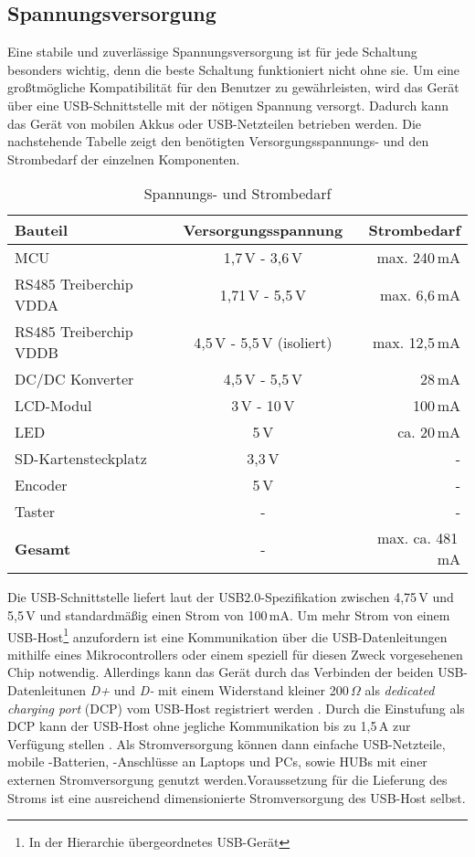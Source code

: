 
\subsection{Spannungsversorgung}
Eine stabile und zuverlässige Spannungsversorgung ist für jede Schaltung besonders wichtig, denn die beste Schaltung funktioniert nicht ohne sie. Um eine großtmögliche Kompatibilität für den Benutzer zu gewährleisten, wird das Gerät über eine USB-Schnittstelle mit der nötigen Spannung versorgt. Dadurch kann das Gerät von mobilen Akkus oder USB-Netzteilen betrieben werden. Die nachstehende Tabelle zeigt den benötigten Versorgungsspannungs- und den Strombedarf der einzelnen Komponenten. 
\begin{table}[h]
	\begin{center}
		\begin{tabular}{l | c | r }
			\textbf{Bauteil} & \textbf{Versorgungsspannung} & \textbf{Strombedarf}\\
			\hline
			MCU & 1,7\,V - 3,6\,V & max. 240\,mA\\
			RS485 Treiberchip VDDA & 1,71\,V - 5,5\,V & max. 6,6\,mA\\
			RS485 Treiberchip VDDB & 4,5\,V - 5,5\,V (isoliert)& max. 12,5\,mA\\
			DC/DC Konverter & 4,5\,V - 5,5\,V & 28\,mA\\
			LCD-Modul & 3\,V - 10\,V & 100\,mA\\
			LED & 5\,V & ca. 20\,mA\\
			SD-Kartensteckplatz & 3,3\,V & -\\
			Encoder & 5\,V & -\\
			Taster & - & -\\
			\hline
			\textbf{Gesamt} & - & max. ca. 481\,mA
		\end{tabular}
	\caption{Spannungs- und Strombedarf}
	\label{tab:VDD+IDD}
	\end{center}
\end{table}
Die USB-Schnittstelle liefert laut der USB2.0-Spezifikation zwischen 4,75\,V und 5,5\,V \cite[S. 283]{USB-PD} und standardmäßig einen Strom von 100\,mA. Um mehr Strom von einem USB-Host\footnote{In der Hierarchie übergeordnetes USB-Gerät} anzufordern ist eine Kommunikation über die USB-Datenleitungen mithilfe eines Mikrocontrollers oder einem speziell für diesen Zweck vorgesehenen Chip notwendig. Allerdings kann das Gerät durch das Verbinden der beiden USB-Datenleitunen \textit{D+} und \textit{D-} mit einem Widerstand kleiner 200\,$\Omega$ als \textit{dedicated charging port} (DCP) vom USB-Host registriert werden \cite[S. 41]{USB-Battery}. Durch die Einstufung als DCP kann der USB-Host ohne jegliche Kommunikation bis zu 1,5\,A zur Verfügung stellen \cite[S. 45]{USB-Battery}. Als Stromversorgung können dann einfache USB-Netzteile, mobile -Batterien, -Anschlüsse an Laptops und PCs, sowie HUBs mit einer externen Stromversorgung genutzt werden.Voraussetzung für die Lieferung des Stroms ist eine ausreichend dimensionierte Stromversorgung des USB-Host selbst. 
